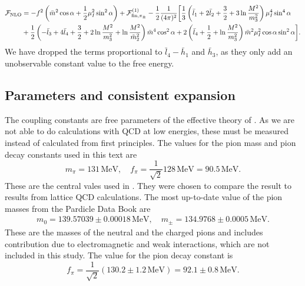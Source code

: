 \begin{align}
    \nonumber
    \Ef_{\mathrm{NLO}} &=
    - f^2 \left(\bar m^2 \cos \alpha + \frac{1}{2}\mu_I^2 \sin^2 \alpha\right)
    + \Ef^{(1)}_{\mathrm{fin}, \pi_\pm}
    - \frac{1}{2}\frac{1}{(4 \pi)^2}
    \bigg[
        \frac{1}{3}
        \left( 
            \bar l_1 + 2 \bar l_2 + \frac{3}{2} + 3 \ln \frac{M^2}{m_3^2}
        \right) \mu_I^4 \sin^4 \alpha
        \\ %
        &
        +
        \frac{1}{2}
        \left(
            - \bar l_3 + 4 \bar l_4 + \frac{3}{2} + 2\ln \frac{M^2}{m_3^2}
            + \ln \frac{M^2}{\tilde m^2_2}
        \right) \bar m^4 \cos^2\alpha 
        + 2 \left(\bar l_4 + \frac{1}{2} + \ln \frac{M^2}{m_3^2}\right)
        \bar m^2 \mu_I^2 \cos\alpha \sin^2 \alpha
        \label{NLO free energy}
    \bigg].
\end{align}
%
We have dropped the terms proportional to $\bar l_4 - \bar h_1$ and $\bar h_3$, as they only add an unobservable constant value to the free energy.


\subsection*{Parameters and consistent expansion}

The coupling constants are free parameters of the effective theory of \chpt.
As we are not able to do calculations with QCD at low energies, these must be measured instead of calculated from first principles.
The values for the pion mass and pion decay constants used in this text are
\begin{equation}
    m_\pi = 131 \, \mathrm{MeV}, \quad 
    f_\pi = \frac{1}{\sqrt 2} 128 \, \mathrm{MeV} = 90.5 \, \mathrm{MeV}.
\end{equation}
%
These are the central vales used in \cite{Andersen:two-flavor-chpt,mojahed}.
They were chosen to compare the result to results from lattice QCD calculations.
The most up-to-date value of the pion masses from the Pardicle Data Book are~\cite{PDG}
\begin{eqnarray}
    m_0 = 139.57039\pm0.00018\, \text{MeV}, \quad
    m_\pm = 134.9768\pm0.0005\, \text{MeV}.
\end{eqnarray}
These are the masses of the neutral and the charged pions and includes contribution due to electromagnetic and weak interactions, which are not included in this study.
The value for the pion decay constant is~\cite{PDG}
\begin{equation}
    f_\pi = \frac{1}{\sqrt{2}} (130.2 \pm 1.2 \, \text{MeV})
    = 92.1 \pm 0.8 \, \text{MeV}.
\end{equation}
%

